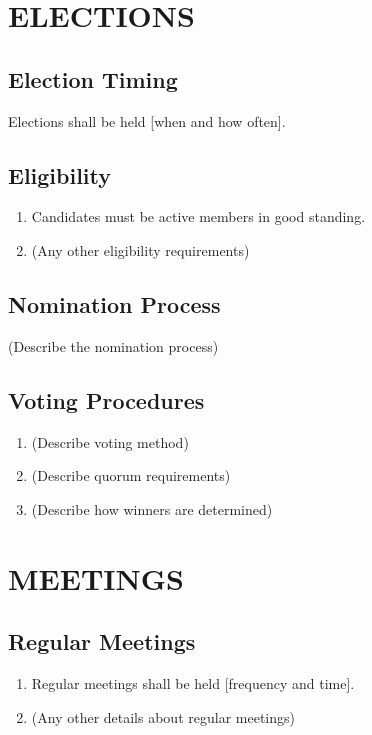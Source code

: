 \documentclass[12pt,letterpaper]{article}
\begin{document}
\section{ELECTIONS}

\subsection{Election Timing}
Elections shall be held [when and how often].

\subsection{Eligibility}
\begin{enumerate}[label=\alph*., leftmargin=2em]
    \item Candidates must be active members in good standing.
    \item (Any other eligibility requirements)
\end{enumerate}

\subsection{Nomination Process}
(Describe the nomination process)

\subsection{Voting Procedures}
\begin{enumerate}[label=\alph*., leftmargin=2em]
    \item (Describe voting method)
    \item (Describe quorum requirements)
    \item (Describe how winners are determined)
\end{enumerate}

\section{MEETINGS}

\subsection{Regular Meetings}
\begin{enumerate}[label=\alph*., leftmargin=2em]
    \item Regular meetings shall be held [frequency and time].
    \item (Any other details about regular meetings)
\end{enumerate}
\end{document}
